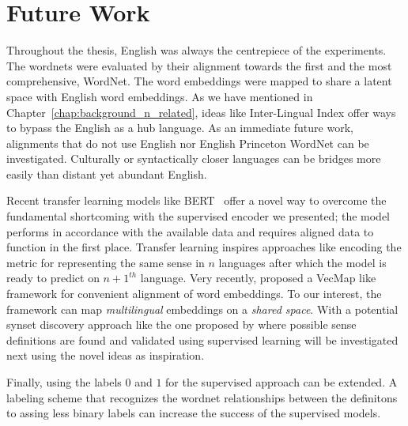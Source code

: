 \section{Future Work}%
\label{sec:future_work}

Throughout the thesis, English was always the centrepiece of the experiments.
The wordnets were evaluated by their alignment towards the first and the most comprehensive, WordNet.
The word embeddings were mapped to share a latent space with English word embeddings.
As we have mentioned in Chapter~\ref{chap:background_n_related}, ideas like Inter-Lingual Index offer ways to bypass the English as a hub language.
As an immediate future work, alignments that do not use English nor English Princeton WordNet can be investigated.
Culturally or syntactically closer languages can be bridges more easily than distant yet abundant English.

Recent transfer learning models like BERT~\cite{devlin_bert_2018} offer a novel way to overcome the fundamental shortcoming with the supervised encoder we presented;
the model performs in accordance with the available data and requires aligned data to function in the first place.
Transfer learning inspires approaches like encoding the metric for representing the same sense in $n$ languages after which the model is ready to predict on $n+1^{th}$ language.
Very recently, \textcite{jawanpuriaLearning2019} proposed a VecMap like framework for convenient alignment of word embeddings.
To our interest, the framework can map \emph{multilingual} embeddings on a \emph{shared space}.
With a potential synset discovery approach like the one proposed by \textcite{ruizcasadoAutomatic2005} where possible sense definitions are found and validated using supervised learning will be investigated next using the novel ideas as inspiration.

Finally, using the labels $0$ and $1$ for the supervised approach can be extended.
A labeling scheme that recognizes the wordnet relationships between the definitons to assing less binary labels can increase the success of the supervised models.

